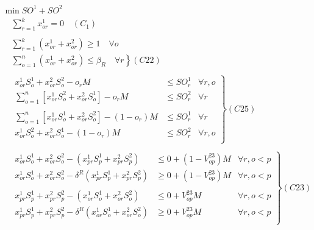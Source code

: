 \documentclass[10pt]{article}
\begin{document}
\begin{displaymath}
    \begin{array}{l}
        \min SO^1 + SO^2 \\
        \quad \sum_{r = 1}^k x_{or}^1 = 0 \quad (C_1) \\
        \\
        \quad \sum_{r = 1}^k (x_{or}^1 + x_{or}^2) \geq 1 \quad \forall o \\
        \quad \left. \sum_{o = 1}^n (x_{or}^1 + x_{or}^2) \leq \beta_R \quad \forall r \right\} (C22) \\
        \\
        \quad \left.
            \begin{array}{rll}
                x_{or}^1 S_o^1 + x_{or}^2 S_o^2 - o_rM & \leq SO_r^1 & \forall r, o \\
                \sum_{o = 1}^n [ x_{or}^1 S_o^2 + x_{or}^2 S_o^1 ] - o_rM & \leq SO_r^2 & \forall r \\
                \\
                \sum_{o = 1}^n [ x_{or}^1 S_o^1 + x_{or}^2 S_o^2 ] - (1 - o_r)M & \leq SO_r^1 & \forall r \\
                x_{or}^1 S_o^2 + x_{or}^2 S_o^1 - (1 - o_r)M & \leq SO_r^2 & \forall r, o \\
        \end{array} \right\} (C25) \\
        \\
        \quad \left.
            \begin{array}{rll}
                x_{or}^1S_o^1 + x_{or}^2S_o^2 - (x_{pr}^1S_p^1 + x_{pr}^2S_p^2) & \leq 0 + (1 - V_{op}^{23})M & \forall r, o < p \\
                x_{or}^1S_o^1 + x_{or}^2S_o^2 - \delta^R (x_{pr}^1S_p^1 + x_{pr}^2S_p^2) & \geq 0 + (1 - V_{op}^{23})M & \forall r, o < p \\
                \\
                x_{pr}^1S_p^1 + x_{pr}^2S_p^2 -  (x_{or}^1S_o^1 + x_{or}^2S_o^2) & \leq 0 + V_{op}^{23}M & \forall r, o < p \\
                x_{pr}^1S_p^1 + x_{pr}^2S_p^2 - \delta^R (x_{or}^1S_o^1 + x_{or}^2S_o^2) & \geq 0 + V_{op}^{23}M & \forall r, o < p \\
        \end{array} \right\} (C23) \\
        \\
        \quad \left.
            \begin{array}{rll}

\end{array}
\end{array}
\end{displaymath}
\end{document}
